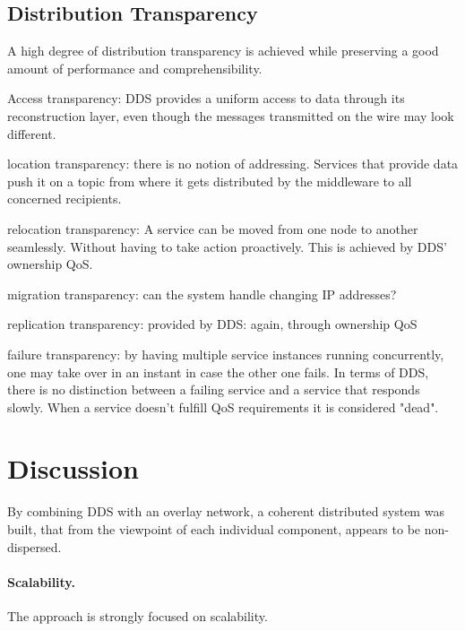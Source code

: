 



\subsection{Distribution Transparency}

A high degree of distribution transparency is achieved while preserving a good amount of performance and comprehensibility.

Access transparency: DDS provides a uniform access to data through its reconstruction layer, even though the messages transmitted on the wire may look different.

location transparency: there is no notion of addressing. Services that provide data push it on a topic from where it gets distributed by the middleware to all concerned recipients.

relocation transparency: A service can be moved from one node to another seamlessly. Without having to take action proactively. This is achieved by DDS' ownership QoS.

migration transparency: can the system handle changing IP addresses?

replication transparency: provided by DDS: again, through ownership QoS

failure transparency: by having multiple service instances running concurrently, one may take over in an instant in case the other one fails. In terms of DDS, there is no distinction between a failing service and a service that responds slowly. When a service doesn't fulfill QoS requirements it is considered "dead".






\section{Discussion}



By combining DDS with an overlay network, a coherent distributed system \cite{tanenbaum2017distributed} was built, that from the viewpoint of each individual component, appears to be non-dispersed.

\paragraph{Scalability.}
The approach is strongly focused on scalability. 

